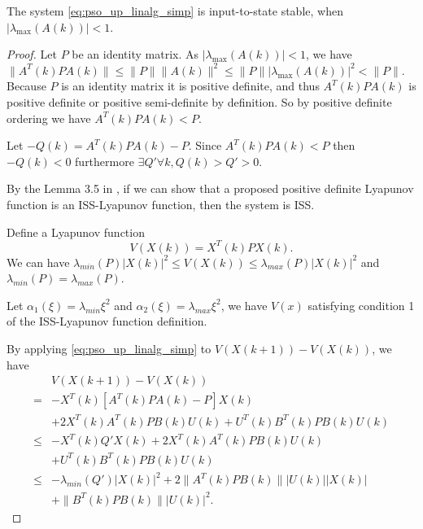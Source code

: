 \begin{mythm}
\label{thm:iss}
The system \eqref{eq:pso_up_linalg_simp} is input-to-state stable, when $ | \lambda_{\max} ( A(k) ) | < 1 $.
\begin{proof}

Let $ P $ be an identity matrix.
As $ | \lambda_{\max} ( A(k) ) | < 1 $, we have
$ \lVert A^{T}(k) P A(k) \rVert \leq \lVert P \rVert \lVert A(k) \rVert^{2} \leq \lVert P \rVert | \lambda_{\max} ( A(k) ) |^{2} < \lVert P \rVert $.
Because $ P $ is an identity matrix it is positive definite, and thus $ A^{T}(k) P A(k) $ is positive definite or positive semi-definite by definition.
So by positive definite ordering we have $ A^{T}(k) P A(k) < P $.

Let $ -Q(k) = A^{T}(k) P A(k) - P $. Since $ A^{T}(k) P A(k) < P $ then $ - Q(k) < 0 $ furthermore $ \exists Q' \forall k, Q(k) > Q' > 0 $. 

By the Lemma 3.5 in \cite{Jiang2001857}, if we can show that a proposed positive definite Lyapunov function is an ISS-Lyapunov function, then the system is ISS.

Define a Lyapunov function
\begin{equation}
\label{eq:lyapunov_v}
V( X(k) ) = X^{T} (k) P X(k).
\end{equation}
We can have
$
\lambda_{min}(P) | X(k) |^{2} \leq V( X(k) )\leq \lambda_{max}(P) | X(k) |^{2}
$ and $ \lambda_{min}(P) = \lambda_{max}(P) $.

Let $ \alpha_{1} ( \xi )= \lambda_{min} \xi^{2} $
and 
$ \alpha_{2} ( \xi )= \lambda_{max} \xi^{2} $,
we have $ V(x) $ satisfying condition 1 of the ISS-Lyapunov function definition.

By applying \eqref{eq:pso_up_linalg_simp} to $ V( X(k+1) ) - V( X(k) ) $, we have
\begin{equation}
\label{eq:lyapunov_delta2}
\begin{aligned}
& V( X(k+1) ) - V( X(k) ) \\
= & - X^{T}(k) [ A^{T}(k) P A(k) - P ] X(k)  \\
& + 2 X^{T}(k)  A^{T}(k) P B(k) U(k) + U^{T}(k) B^{T}(k) P B(k) U(k) \\
\leq & - X^{T}(k) Q' X(k) + 2 X^{T}(k)  A^{T}(k) P B(k) U(k) \\
& + U^{T}(k) B^{T}(k) P B(k) U(k) \\
\leq & - \lambda_{min}(Q') | X(k) |^{2} + 2  \lVert A^{T}(k) P B(k) \rVert | U(k) | | X(k) | \\
& + \lVert B^{T}(k) P B(k) \rVert | U(k) |^{2}.
\end{aligned}
\end{equation}


\end{proof}
\end{mythm}
